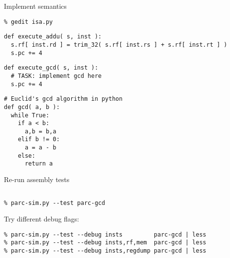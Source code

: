 \begin{task}
\begin{frame}[fragile]{Implement semantics}

\vspace{-15pt}

\begin{Verbatim}[commandchars=\\\{\}]
% cd \midtilde/pydgin/parc
% gedit isa.py
\end{Verbatim}

\vspace{-20pt}

\begin{lstlisting}[firstnumber=319]
def execute_addu( s, inst ):
  s.rf[ inst.rd ] = trim_32( s.rf[ inst.rs ] + s.rf[ inst.rt ] )
  s.pc += 4
\end{lstlisting}
\vspace{-20pt}
\begin{lstlisting}[firstnumber=976]
def execute_gcd( s, inst ):
  # TASK: implement gcd here
  s.pc += 4
\end{lstlisting}
\vspace{-20pt}
\begin{lstlisting}[numbers=none]
# Euclid's gcd algorithm in python
def gcd( a, b ):
  while True:
    if a < b:
      a,b = b,a
    elif b != 0:
      a = a - b
    else:
      return a
\end{lstlisting}

\end{frame}
\end{task}


\begin{task}
\begin{frame}[fragile]{Re-run assembly tests}

\begin{Verbatim}[commandchars=\\\{\}]
% cd \midtilde/pydgin/parc/asm_tests/build

% parc-sim.py --test parc-gcd
\end{Verbatim}

Try different debug flags:

{\small
\begin{verbatim}
% parc-sim.py --test --debug insts         parc-gcd | less
% parc-sim.py --test --debug insts,rf,mem  parc-gcd | less
% parc-sim.py --test --debug insts,regdump parc-gcd | less
\end{verbatim}}

\end{frame}
\end{task}

